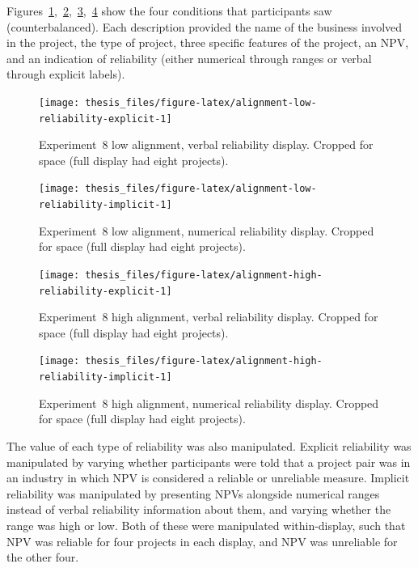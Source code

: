 \documentclass[a4paper, nobind, dvipsnames]{templates/ociamthesis}
\theoremstyle{definition}
\theoremstyle{definition}
\theoremstyle{definition}
\theoremstyle{definition}
\theoremstyle{remark}
\begin{document}
Figures~\ref{fig:alignment-low-reliability-explicit},~\ref{fig:alignment-low-reliability-implicit},~\ref{fig:alignment-high-reliability-explicit},~\ref{fig:alignment-high-reliability-implicit}
show the four conditions that participants saw (counterbalanced). Each
description provided the name of the business involved in the project, the type
of project, three specific features of the project, an NPV, and an indication of
reliability (either numerical through ranges or verbal through explicit labels).

\begin{figure}
\texttt{[image: thesis\_files/figure-latex/alignment-low-reliability-explicit-1]} \caption{Experiment 8 low alignment, verbal reliability display. Cropped for space (full display had eight projects).}\label{fig:alignment-low-reliability-explicit}
\end{figure}

\begin{figure}
\texttt{[image: thesis\_files/figure-latex/alignment-low-reliability-implicit-1]} \caption{Experiment 8 low alignment, numerical reliability display. Cropped for space (full display had eight projects).}\label{fig:alignment-low-reliability-implicit}
\end{figure}

\begin{figure}
\texttt{[image: thesis\_files/figure-latex/alignment-high-reliability-explicit-1]} \caption{Experiment 8 high alignment, verbal reliability display. Cropped for space (full display had eight projects).}\label{fig:alignment-high-reliability-explicit}
\end{figure}

\begin{figure}
\texttt{[image: thesis\_files/figure-latex/alignment-high-reliability-implicit-1]} \caption{Experiment 8 high alignment, numerical reliability display. Cropped for space (full display had eight projects).}\label{fig:alignment-high-reliability-implicit}
\end{figure}

The value of each type of reliability was also manipulated. Explicit reliability
was manipulated by varying whether participants were told that a project pair
was in an industry in which NPV is considered a reliable or unreliable measure.
Implicit reliability was manipulated by presenting NPVs alongside numerical
ranges instead of verbal reliability information about them, and varying whether
the range was high or low. Both of these were manipulated within-display, such
that NPV was reliable for four projects in each display, and NPV was unreliable
for the other four.
\end{document}

